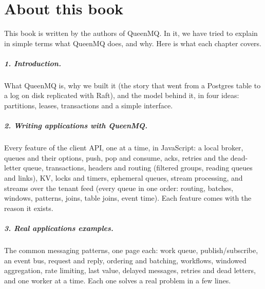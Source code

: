 
\chapter*{About this book}

This book is written by the authors of QueenMQ. In it, we have tried to explain in simple terms
what QueenMQ does, and why. Here is what each chapter covers.

\paragraph{1. Introduction.} What QueenMQ is, why we built it (the story that went from a Postgres
table to a log on disk replicated with Raft), and the model behind it, in four ideas: partitions,
leases, transactions and a simple interface.

\paragraph{2. Writing applications with QueenMQ.} Every feature of the client API, one at a time, in
JavaScript: a local broker, queues and their options, push, pop and consume, acks, retries and the
dead-letter queue, transactions, headers and routing (filtered groups, reading queues and links),
KV, locks and timers, ephemeral queues, stream processing, and
streams over the tenant feed (every queue in one order: routing, batches, windows, patterns, joins,
table joins, event time). Each feature comes with the reason it exists.

\paragraph{3. Real applications examples.} The common messaging patterns, one page each: work queue,
publish/subscribe, an event bus, request and reply, ordering and batching, workflows, windowed aggregation, rate
limiting, last value, delayed messages, retries and dead letters, and one worker at a time. Each
one solves a real problem in a few lines.

